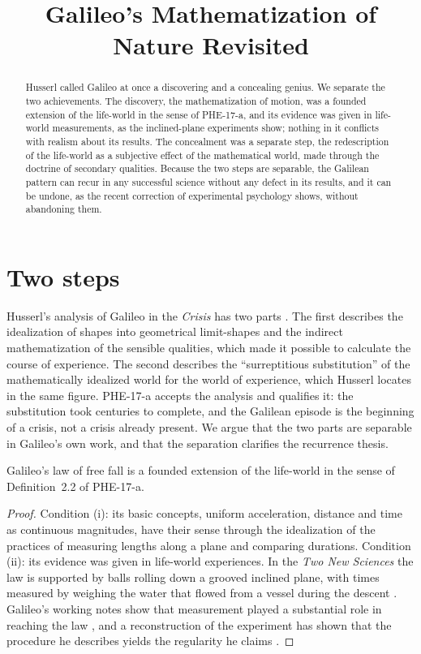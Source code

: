 \documentclass{situationist-preprint}
\title{Galileo's Mathematization of Nature Revisited}
\begin{document}
\maketitle

\begin{abstract}
Husserl called Galileo at once a discovering and a concealing genius. We separate the two achievements. The discovery, the mathematization of motion, was a founded extension of the life-world in the sense of PHE-17-a, and its evidence was given in life-world measurements, as the inclined-plane experiments show; nothing in it conflicts with realism about its results. The concealment was a separate step, the redescription of the life-world as a subjective effect of the mathematical world, made through the doctrine of secondary qualities. Because the two steps are separable, the Galilean pattern can recur in any successful science without any defect in its results, and it can be undone, as the recent correction of experimental psychology shows, without abandoning them.
\end{abstract}

\section{Two steps}

Husserl's analysis of Galileo in the \emph{Crisis} has two parts \citep[§9]{Husserl1954}. The first describes the idealization of shapes into geometrical limit-shapes and the indirect mathematization of the sensible qualities, which made it possible to calculate the course of experience. The second describes the \enquote{surreptitious substitution} of the mathematically idealized world for the world of experience, which Husserl locates in the same figure. PHE-17-a accepts the analysis and qualifies it: the substitution took centuries to complete, and the Galilean episode is the beginning of a crisis, not a crisis already present. We argue that the two parts are separable in Galileo's own work, and that the separation clarifies the recurrence thesis.

\begin{proposition}\label{p:founded}
Galileo's law of free fall is a founded extension of the life-world in the sense of Definition~2.2 of PHE-17-a.
\end{proposition}

\begin{proof}
Condition (i): its basic concepts, uniform acceleration, distance and time as continuous magnitudes, have their sense through the idealization of the practices of measuring lengths along a plane and comparing durations. Condition (ii): its evidence was given in life-world experiences. In the \emph{Two New Sciences} the law is supported by balls rolling down a grooved inclined plane, with times measured by weighing the water that flowed from a vessel during the descent \citep[Third Day]{Galileo1638}. Galileo's working notes show that measurement played a substantial role in reaching the law \citep{Drake1978}, and a reconstruction of the experiment has shown that the procedure he describes yields the regularity he claims \citep{Settle1961}.
\end{proof}
\end{document}
